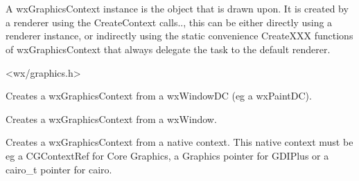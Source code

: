 
\section{}\label{wxgraphicscontext}

A wxGraphicsContext instance is the object that is drawn upon. It is created by a renderer using the CreateContext calls.., this can be either directly using a renderer 
instance, or indirectly using the static convenience CreateXXX functions of wxGraphicsContext that always delegate the task to the default renderer.




<wx/graphics.h>




\label{wxgraphicscontextcreate}


Creates a wxGraphicsContext from a wxWindowDC (eg a wxPaintDC).


Creates a wxGraphicsContext from a wxWindow.



\label{wxgraphicscontextcreatefromnative}

Creates a wxGraphicsContext from a native context. This native context must be eg a CGContextRef for Core Graphics, a Graphics pointer for GDIPlus or a 
cairo\_t pointer for cairo.

